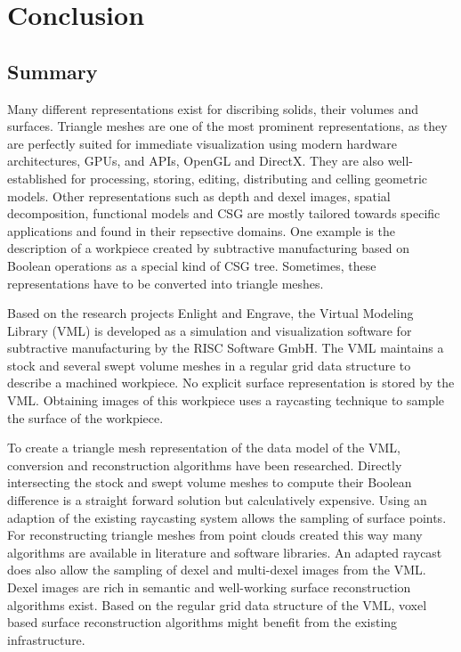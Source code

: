 \chapter{Conclusion}
\label{ch:conclusion}

\section{Summary}
\label{sec:summary}

Many different representations exist for discribing solids, their volumes and surfaces.
Triangle meshes are one of the most prominent representations, as they are perfectly suited for immediate visualization using modern hardware architectures, \ie GPUs, and APIs, \eg OpenGL and DirectX.
They are also well-established for processing, storing, editing, distributing and celling geometric models.
Other representations such as depth and dexel images, spatial decomposition, functional models and CSG are mostly tailored towards specific applications and found in their repsective domains.
One example is the description of a workpiece created by subtractive manufacturing based on Boolean operations as a special kind of CSG tree.
Sometimes, these representations have to be converted into triangle meshes.

Based on the research projects Enlight and Engrave, the Virtual Modeling Library (VML) is developed as a simulation and visualization software for subtractive manufacturing by the RISC Software GmbH.
The VML maintains a stock and several swept volume meshes in a regular grid data structure to describe a machined workpiece.
No explicit surface representation is stored by the VML.
Obtaining images of this workpiece uses a raycasting technique to sample the surface of the workpiece.

To create a triangle mesh representation of the data model of the VML, conversion and reconstruction algorithms have been researched.
%
Directly intersecting the stock and swept volume meshes to compute their Boolean difference is a straight forward solution but calculatively expensive.
%
Using an adaption of the existing raycasting system allows the sampling of surface points.
For reconstructing triangle meshes from point clouds created this way many algorithms are available in literature and software libraries.
%
An adapted raycast does also allow the sampling of dexel and multi-dexel images from the VML.
Dexel images are rich in semantic and well-working surface reconstruction algorithms exist.
%
Based on the regular grid data structure of the VML, voxel based surface reconstruction algorithms might benefit from the existing infrastructure.

